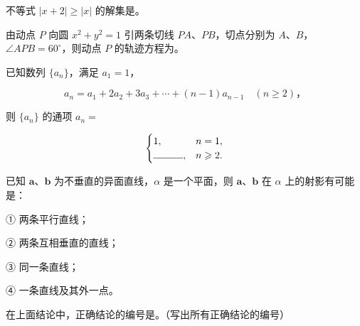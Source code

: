 \begin{question}
不等式 $|x+2|\geqslant|x|$ 的解集是\gkblank{}。

\end{question}
\begin{question}
由动点 $P$ 向圆 $x^2+y^2=1$ 引两条切线 $PA\text{、}PB$，切点分别为 $A\text{、}B$，$\angle APB=60^\circ$，则动点 $P$ 的轨迹方程为\gkblank{}。

\end{question}
\begin{question}
已知数列 $\{a_n\}$，满足 $a_1=1$，

\nopagebreak[4]
\[
a_n=a_1+2a_2+3a_3+\cdots+(n-1)a_{n-1}\quad(n\geqslant2)\text{，}
\]

则 $\{a_n\}$ 的通项 $a_n=$

\nopagebreak[4]
\[
\begin{cases}
1,&n=1,\\
\rule{3em}{0.4pt},&n\geqslant2.
\end{cases}
\]

\end{question}
\begin{question}
已知 $\boldsymbol a\text{、}\boldsymbol b$ 为不垂直的异面直线，$\alpha$ 是一个平面，则 $\boldsymbol a\text{、}\boldsymbol b$ 在 $\alpha$ 上的射影有可能是：

① 两条平行直线；

② 两条互相垂直的直线；

③ 同一条直线；

④ 一条直线及其外一点。

在上面结论中，正确结论的编号是\gkblank{}。（写出所有正确结论的编号）

\end{question}

